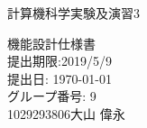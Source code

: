 \documentclass[a4paper,11pt,oneside,openany]{jsarticle}
\begin{document}
\begin{center}

  \vspace*{40mm}
  \huge 計算機科学実験及演習3 \par
  機能設計仕様書\\
  \vspace{90mm}
  \Large 提出期限:2019/5/9\\
   提出日: \today \\
  \vspace{15mm}
  \Large グループ番号: 9    \\
   1029293806\hspace{5mm}大山 偉永\par


  \vspace{10mm}
\end{center}
\clearpage
\addtocounter{page}{-1}

\newpage
\end{document}
